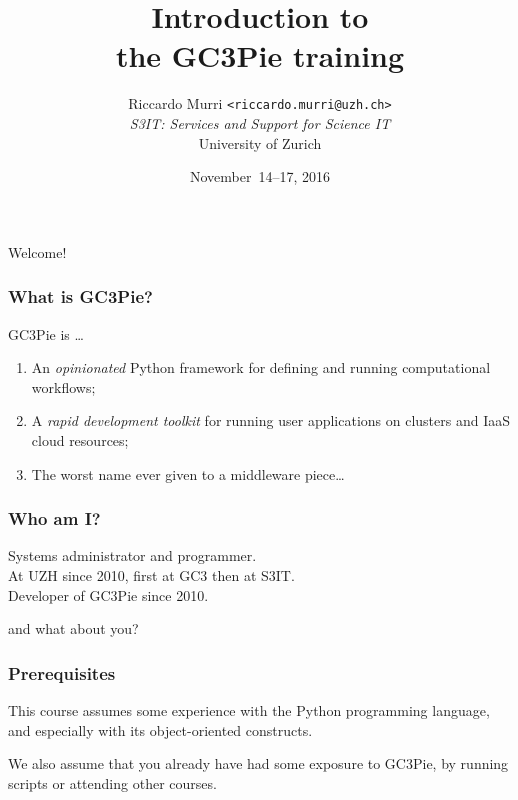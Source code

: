 \documentclass[english,serif,mathserif,xcolor=pdftex,dvipsnames,table]{beamer}
\title[Introduction]{%
  Introduction to \\ the GC3Pie training
}
\author[R. Murri, S3IT UZH]{%
  Riccardo Murri \texttt{<riccardo.murri@uzh.ch>}
  \\[1ex]
  \emph{S3IT: Services and Support for Science IT}
  \\[1ex]
  University of Zurich
}
\date{November~14--17, 2016}
\begin{document}
\maketitle

\begin{frame}
  \begin{center}
    {\Huge Welcome!}
  \end{center}
\end{frame}


\begin{frame}
  \frametitle{What is GC3Pie?}
  GC3Pie is \ldots
  \begin{enumerate}
  \item \alert<2>{An \emph{opinionated} Python framework for defining and running computational workflows;}
  \item A \emph{rapid development toolkit} for running user applications on clusters and IaaS cloud resources;
  \item The worst name ever given to a middleware piece\ldots
  \end{enumerate}

  \+
\end{frame}


\begin{frame}
  \frametitle{Who am I?}
  \begin{center}
    Systems administrator and programmer.
    \\ \+
    At UZH since 2010, first at GC3 then at S3IT.
    \\ \+
    Developer of GC3Pie since 2010.
  \end{center}
\end{frame}


\begin{frame}
  \begin{center}
    {\Huge and what about you?}
  \end{center}
\end{frame}


\begin{frame}
  \frametitle{Prerequisites}
  This course assumes some experience with the Python programming
  language, and especially with its  object-oriented constructs.

  \+
  We also assume that you already have had some exposure to GC3Pie,
  by running scripts or attending other courses.
\end{frame}
\end{document}
